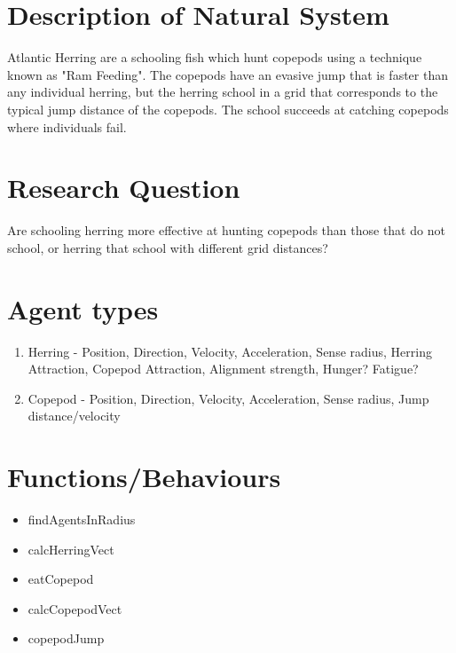 \documentclass{article}
\begin{document}
\pagestyle{empty}



\section{Description of Natural System}

Atlantic Herring are a schooling fish which hunt copepods using a technique known as "Ram Feeding". The copepods have an evasive jump that is faster than any individual herring, but the herring school in a grid that corresponds to the typical jump distance of the copepods. The school succeeds at catching copepods where individuals fail.

\section{Research Question}

Are schooling herring more effective at hunting copepods than those that do not school, or herring that school with different grid distances?

\section{Agent types}

\begin{enumerate}
\itemsep 0em 
\item Herring - Position, Direction, Velocity, Acceleration, Sense radius, Herring Attraction, Copepod Attraction, Alignment strength,  Hunger? Fatigue?
\item Copepod - Position, Direction, Velocity, Acceleration, Sense radius, Jump distance/velocity
\end{enumerate}

\section{Functions/Behaviours}

\begin{itemize}
\itemsep 0em 
\item findAgentsInRadius
\item calcHerringVect
\item eatCopepod
\item calcCopepodVect
\item copepodJump

\end{itemize}
\end{document}
